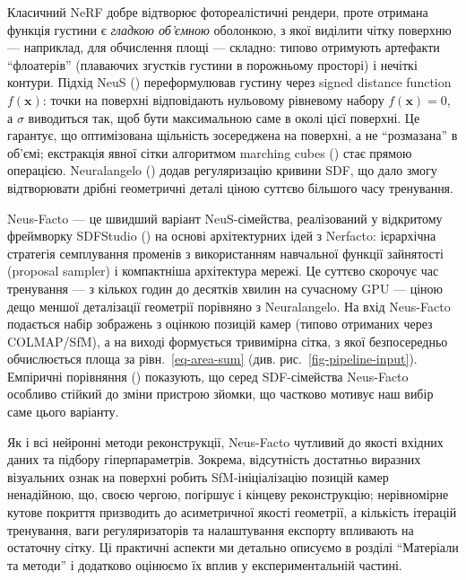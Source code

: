 \documentclass[
  ukrainian,
  10pt,
  a4paper,
  twocolumn]{article}
\begin{document}
Класичний NeRF добре відтворює фотореалістичні рендери, проте отримана
функція густини є \emph{гладкою об'ємною} оболонкою, з якої виділити
чітку поверхню --- наприклад, для обчислення площі --- складно: типово
отримують артефакти ``флоатерів'' (плаваючих згустків густини в
порожньому просторі) і нечіткі контури. Підхід NeuS
() переформулював густину
через signed distance function \(f(\mathbf{x})\): точки на поверхні
відповідають нульовому рівневому набору \(f(\mathbf{x}) = 0\), а
\(\sigma\) виводиться так, щоб бути максимальною саме в околі цієї
поверхні. Це гарантує, що оптимізована щільність зосереджена на
поверхні, а не ``розмазана'' в об'ємі; екстракція явної сітки алгоритмом
marching cubes () стає прямою операцією. Neuralangelo
() додав регуляризацію
кривини SDF, що дало змогу відтворювати дрібні геометричні деталі ціною
суттєво більшого часу тренування.

Neus-Facto --- це швидший варіант NeuS-сімейства, реалізований у
відкритому фреймворку SDFStudio () на основі архітектурних ідей з Nerfacto: ієрархічна стратегія
семплування променів з використанням навчальної функції зайнятості
(proposal sampler) і компактніша архітектура мережі. Це суттєво скорочує
час тренування --- з кількох годин до десятків хвилин на сучасному GPU
--- ціною дещо меншої деталізації геометрії порівняно з Neuralangelo. На
вхід Neus-Facto подається набір зображень з оцінкою позицій камер
(типово отриманих через COLMAP/SfM), а на виході формується тривимірна
сітка, з якої безпосередньо обчислюється площа за
рівн.~\ref{eq-area-sum} (див. рис.~\ref{fig-pipeline-input}). Емпіричні
порівняння () показують, що серед SDF-сімейства Neus-Facto особливо стійкий до
зміни пристрою зйомки, що частково мотивує наш вибір саме цього
варіанту.

Як і всі нейронні методи реконструкції, Neus-Facto чутливий до якості
вхідних даних та підбору гіперпараметрів. Зокрема, відсутність достатньо
виразних візуальних ознак на поверхні робить SfM-ініціалізацію позицій
камер ненадійною, що, своєю чергою, погіршує і кінцеву реконструкцію;
нерівномірне кутове покриття призводить до асиметричної якості
геометрії, а кількість ітерацій тренування, ваги регуляризаторів та
налаштування експорту впливають на остаточну сітку. Ці практичні аспекти
ми детально описуємо в розділі ``Матеріали та методи'' і додатково
оцінюємо їх вплив у експериментальній частині.
\end{document}
